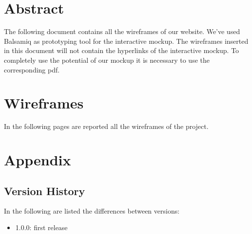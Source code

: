 \documentclass{../Common/Structure/doc_pdf}
\begin{document}
\titleToc

\chapter{Abstract}
\thispagestyle{fancy}
The following document contains all the wireframes of our website. We've used Balsamiq as prototyping tool for the interactive mockup. The wireframes inserted in this document will not contain the hyperlinks of the interactive mockup. To completely use the potential of our mockup it is necessary to use the corresponding pdf.

\chapter{Wireframes}
\thispagestyle{fancy}
In the following pages are reported all the wireframes of the project.


\appendix
\chapter{Appendix}
\section{Version History}
In the following are listed the differences between versions:
\begin{itemize}
	\item 1.0.0: first release
\end{itemize}
\end{document}
